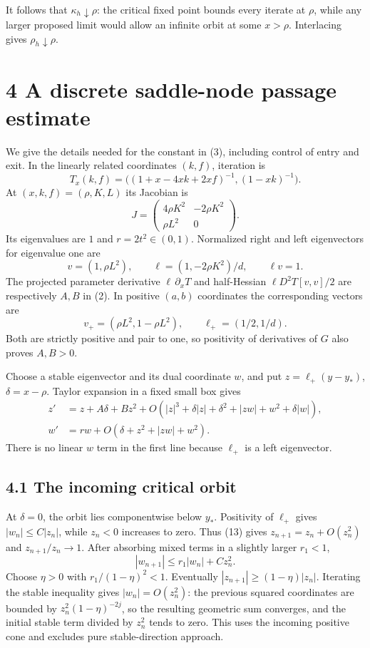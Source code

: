 \documentclass[11pt,letterpaper]{article}
\begin{document}
It follows that \(\kappa_h\downarrow\rho\): the critical fixed point
bounds every iterate at \(\rho\), while any larger proposed limit would
allow an infinite orbit at some \(x>\rho\). Interlacing gives
\(\rho_h\downarrow\rho\).

\section{4 A discrete saddle-node passage
estimate}\label{a-discrete-saddle-node-passage-estimate}

We give the details needed for the constant in (3), including control of
entry and exit. In the linearly related coordinates \((k,f)\), iteration
is \[T_x(k,f)=\bigl((1+x-4xk+2xf)^{-1},(1-xk)^{-1}\bigr).\] At
\((x,k,f)=(\rho,K,L)\) its Jacobian is
\[J=\begin{pmatrix}4\rho K^2&-2\rho K^2\\\rho L^2&0\end{pmatrix}.\] Its
eigenvalues are \(1\) and \(r=2t^2\in(0,1)\). Normalized right and left
eigenvectors for eigenvalue one are
\[v=(1,\rho L^2),\qquad \ell=(1,-2\rho K^2)/d,\qquad \ell v=1.\] The
projected parameter derivative \(\ell\,\partial_xT\) and half-Hessian
\(\ell D^2T[v,v]/2\) are respectively \(A,B\) in (2). In positive
\((a,b)\) coordinates the corresponding vectors are
\[v_+=(\rho L^2,1-\rho L^2),\qquad \ell_+=(1/2,1/d).\] Both are strictly
positive and pair to one, so positivity of derivatives of \(G\) also
proves \(A,B>0\).

Choose a stable eigenvector and its dual coordinate \(w\), and put
\(z=\ell_+(y-y_*)\), \(\delta=x-\rho\). Taylor expansion in a fixed
small box gives \[
\begin{aligned}
 z'&=z+A\delta+Bz^2+
 O(|z|^3+\delta|z|+\delta^2+|zw|+w^2+\delta|w|),\\
 w'&=rw+O(\delta+z^2+|zw|+w^2).
\end{aligned}                                                \tag{13}
\] There is no linear \(w\) term in the first line because \(\ell_+\) is
a left eigenvector.

\subsection{4.1 The incoming critical
orbit}\label{the-incoming-critical-orbit}

At \(\delta=0\), the orbit lies componentwise below \(y_*\). Positivity
of \(\ell_+\) gives \(|w_n|\le C|z_n|\), while \(z_n<0\) increases to
zero. Thus (13) gives \(z_{n+1}=z_n+O(z_n^2)\) and \(z_{n+1}/z_n\to1\).
After absorbing mixed terms in a slightly larger \(r_1<1\),
\[|w_{n+1}|\le r_1|w_n|+Cz_n^2.\] Choose \(\eta>0\) with
\(r_1/(1-\eta)^2<1\). Eventually \(|z_{n+1}|\ge(1-\eta)|z_n|\).
Iterating the stable inequality gives \(|w_n|=O(z_n^2)\): the previous
squared coordinates are bounded by \(z_n^2(1-\eta)^{-2j}\), so the
resulting geometric sum converges, and the initial stable term divided
by \(z_n^2\) tends to zero. This uses the incoming positive cone and
excludes pure stable-direction approach.
\end{document}
